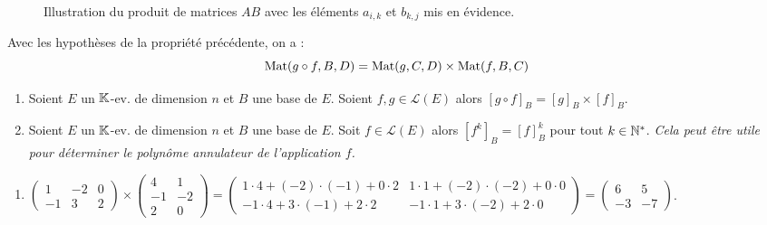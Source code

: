 \documentclass[12pt, a4paper]{report}
\begin{document}
\begin{figure}[H]
    \caption{Illustration du produit de matrices $AB$ avec les éléments $a_{i,k}$ et $b_{k,j}$ mis en évidence.}
\end{figure}

\begin{consequence}
    Avec les hypothèses de la propriété précédente, on a :
    $$\mathrm{Mat}(g \circ f, B, D) = \mathrm{Mat}(g,C,D) \times \mathrm{Mat}(f,B,C)$$
\end{consequence}

\begin{consequence}
    \begin{enumerate}
        \item Soient $E$ un $\mathbb{K}$-ev. de dimension $n$ et $B$ une base de $E$. Soient $f,g \in \mathcal L(E)$ alors $[g\circ f]_B = [g]_B \times [f]_B$.
        \item Soient $E$ un $\mathbb{K}$-ev. de dimension $n$ et $B$ une base de $E$. Soit $f \in \mathcal L(E)$ alors $[f^k]_B = [f]_B^k$ pour tout $k \in \mathbb{N}^*$. \textit{Cela peut être utile pour déterminer le polynôme annulateur de l'application $f$.}
    \end{enumerate}
\end{consequence}

\begin{example}
    \begin{enumerate}
        \item $\left(\begin{matrix} 1 & -2 & 0 \\ -1 & 3 & 2 \end{matrix}\right) \times \left(\begin{matrix} 4 & 1 \\ -1 & -2 \\ 2 & 0 \end{matrix}\right) = \left(\begin{matrix} 1\cdot 4 + (-2)\cdot (-1) + 0\cdot 2 & 1\cdot 1 + (-2)\cdot (-2) + 0\cdot 0 \\ -1\cdot 4 + 3\cdot (-1) + 2\cdot 2 & -1\cdot 1 + 3\cdot (-2) + 2\cdot 0 \end{matrix}\right) = \left(\begin{matrix} 6 & 5 \\ -3 & -7 \end{matrix}\right)$.
    \end{enumerate}
\end{example}
\end{document}

